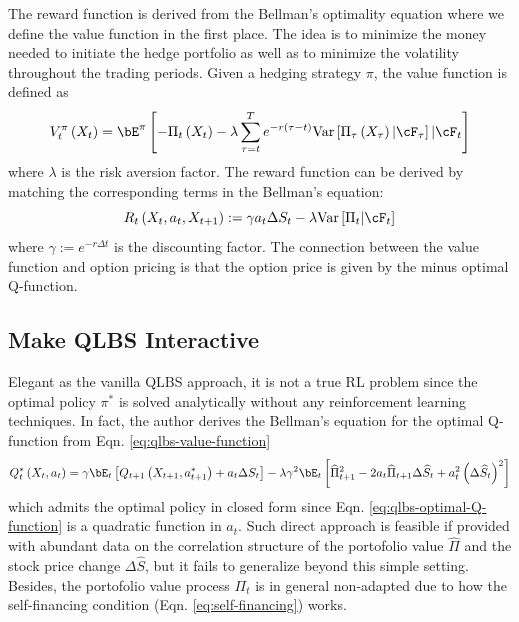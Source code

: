 The reward function is derived from the Bellman's optimality equation
where we define the value function in the first place. The idea is
to minimize the money needed to initiate the hedge portfolio as well
as to minimize the volatility throughout the trading periods. Given
a hedging strategy $\pi$, the value function is defined as
\begin{equation}
V_{t}^{\pi}\left(X_{t}\right)=\bE^{\pi}\left[-\Pi_{t}\left(X_{t}\right)-\lambda\sum_{\tau=t}^{T}e^{-r\left(\tau-t\right)}\text{Var}\left[\Pi_{\tau}\left(X_{\tau}\right)|\cF_{\tau}\right]|\cF_{t}\right]\label{eq:qlbs-value-function}
\end{equation}
where $\lambda$ is the risk aversion factor. The reward function
can be derived by matching the corresponding terms in the Bellman's
equation:
\[
R_{t}\left(X_{t},a_{t},X_{t+1}\right):=\gamma a_{t}\Delta S_{t}-\lambda\text{Var}\left[\Pi_{t}|\cF_{t}\right]
\]
where $\gamma:=e^{-r\Delta t}$ is the discounting factor. The connection
between the value function and option pricing is that the option price
is given by the minus optimal Q-function.

\subsection{Make QLBS Interactive}

Elegant as the vanilla QLBS approach, it is not a true RL problem
since the optimal policy $\pi^{*}$ is solved analytically without
any reinforcement learning techniques. In fact, the author derives
the Bellman's equation for the optimal Q-function from Eqn. \ref{eq:qlbs-value-function}
\begin{equation}
Q_{t}^{*}\left(X_{t},a_{t}\right)=\gamma\bE_{t}\left[Q_{t+1}\left(X_{t+1},a_{t+1}^{*}\right)+a_{t}\Delta S_{t}\right]-\lambda\gamma^{2}\bE_{t}\left[\widehat{\Pi}_{t+1}^{2}-2a_{t}\widehat{\Pi}_{t+1}\Delta\widehat{S}_{t}+a_{t}^{2}\left(\Delta\widehat{S}_{t}\right)^{2}\right]\label{eq:qlbs-optimal-Q-function}
\end{equation}
which admits the optimal policy in closed form since Eqn. \ref{eq:qlbs-optimal-Q-function}
is a quadratic function in $a_{t}$. Such direct approach is feasible
if provided with abundant data on the correlation structure of the
portofolio value $\widehat{\Pi}$ and the stock price change $\Delta\widehat{S}$,
but it fails to generalize beyond this simple setting. Besides, the
portofolio value process $\Pi_{t}$ is in general non-adapted due
to how the self-financing condition (Eqn. \ref{eq:self-financing})
works. 

